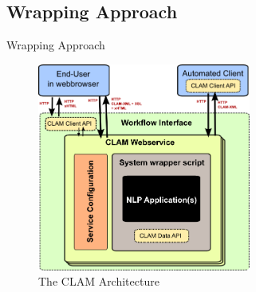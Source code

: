 \documentclass[compress]{beamer}
\begin{document}
\subsection{Wrapping Approach}
\begin{frame}

    \begin{block}{Wrapping Approach}

        \begin{figure}[h]
        \begin{center}
        \includegraphics[width=70.0mm]{architecture.png}
        \end{center}
        \caption{The CLAM Architecture}
        \label{fig:arch} 
        \end{figure}


    \end{block}

\end{frame}
\end{document}
